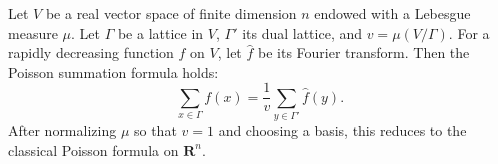Let $V$ be a real vector space of finite dimension $n$ endowed with a Lebesgue measure $\mu$. Let $\Gamma$ be a lattice in $V$, $\Gamma'$ its dual lattice, and $v = \mu(V/\Gamma)$. For a rapidly decreasing function $f$ on $V$, let $\hat{f}$ be its Fourier transform. Then the Poisson summation formula holds:
$$\sum_{x \in \Gamma} f(x) = \frac{1}{v} \sum_{y \in \Gamma'} \hat{f}(y).$$
After normalizing $\mu$ so that $v = 1$ and choosing a basis, this reduces to the classical Poisson formula on $\mathbf{R}^n$.
